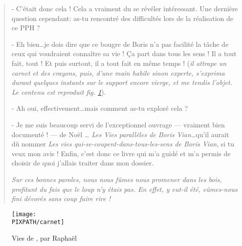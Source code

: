 \begin{quotation}
- C'était donc cela ! Cela a vraiment du se révéler intéressant. Une dernière question cependant:
as-tu rencontré des difficultés lors de la réalisation de ce PPH ?

- Eh bien\ldots je dois dire que ce bougre de Boris n'a pas facilité la tâche
de ceux qui voudraient connaître sa vie ! Ça part dans tous les sens ! Il a tout fait, tout !
Et puis surtout, il a tout fait en même temps !
(\emph{il attrape un carnet et des crayons, puis, d'une main habile sinon experte, s'exprima 
durant quelques instants sur le support encore vierge, et me tendis l'objet.
Le contenu est reproduit fig. \ref{carnet}}).

- Ah oui, effectivement\ldots mais comment as-tu exploré cela ?

- Je me suis beaucoup servi de l'exceptionnel ouvrage --- vraiment bien documenté ! --- de Noël \ldots
\emph{Les Vies parallèles de Boris Vian}\ldots qu'il aurait dû nommer
\emph{Les vies qui-se-coupent-dans-tous-les-sens de Boris Vian}, si tu veux mon avis !
Enfin, c'est donc ce livre qui m'a guidé et m'a permis de choisir de quoi j'allais traiter
dans mon dossier.

\emph{Sur ces bonnes paroles, nous nous fûmes nous promener dans les bois,
profitant du fais que le loup n'y étais pas. En effet, y eut-il été,
eûmes-nous fini dévorés sans coup faire rire !}
 
\end{quotation}

\begin{figure}
\centering
\texttt{[image: \\PIXPATH/carnet]}
\caption{Vies de \BV, par Raphaël }
\label{carnet}
\end{figure}

